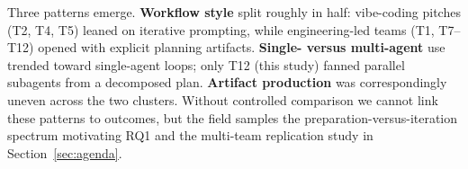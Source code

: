 Three patterns emerge. \textbf{Workflow style} split roughly in half:
vibe-coding pitches (T2, T4, T5) leaned on iterative prompting, while
engineering-led teams (T1, T7--T12) opened with explicit planning
artifacts. \textbf{Single- versus multi-agent} use trended toward
single-agent loops; only T12 (this study) fanned parallel subagents
from a decomposed plan. \textbf{Artifact production} was correspondingly
uneven across the two clusters. Without controlled comparison we
cannot link these patterns to outcomes, but the field samples the
preparation-versus-iteration spectrum motivating RQ1 and the
multi-team replication study in Section~\ref{sec:agenda}.
